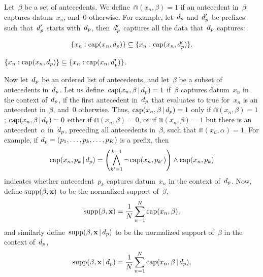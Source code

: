 Let~$\beta$ be a set of antecedents.
%
We define~${\Cap(x_n, \beta) = 1}$ if an antecedent in~$\beta$
captures datum~$x_n$, and~0 otherwise.
%
For example, let~$d_p$ and~$d_p'$ be prefixes such that~$d_p'$ starts
with~$d_p$, then~$d_p'$ captures all the data that~$d_p$ captures:
\begin{arxiv}
\begin{align*}
\{x_n: \textnormal{cap}(x_n, d_p)\} \subseteq \{x_n: \textnormal{cap}(x_n, d_p')\}.
\end{align*}
\end{arxiv}
\begin{kdd}
${\{x_n: \textnormal{cap}(x_n, d_p)\} \subseteq \{x_n: \textnormal{cap}(x_n, d_p')\}}$.
\end{kdd}

Now let~$d_p$ be an ordered list of antecedents,
and let~$\beta$ be a subset of antecedents in~$d_p$.
%
Let us define~${\textnormal{cap}(x_n, \beta \,|\, d_p) = 1}$ if~$\beta$
captures datum~$x_n$ in the context of~$d_p$,
\ie if the first antecedent in~$d_p$ that evaluates to true for~$x_n$
is an antecedent in~$\beta$, and~0 otherwise.
%
Thus, ${\textnormal{cap}(x_n, \beta \,|\, d_p) = 1}$ only if ${\Cap(x_n, \beta) = 1}$;
${\textnormal{cap}(x_n, \beta \,|\, d_p) = 0}$ either if ${\Cap(x_n, \beta) = 0}$,
or if ${\Cap(x_n, \beta) = 1}$ but there is an antecedent~$\alpha$ in~$d_p$,
preceding all antecedents in~$\beta$, such that ${\Cap(x_n, \alpha) = 1}$.
%
For example, if ${d_p = (p_1, \dots, p_k, \dots, p_K)}$ is a prefix, then
\begin{align*}
\textnormal{cap}(x_n, p_k \,|\, d_p) =
  \left(\bigwedge_{k'=1}^{k - 1} \neg\, \textnormal{cap}(x_n, p_{k'}) \right)
  \wedge \textnormal{cap}(x_n, p_k)
\end{align*}
indicates whether antecedent~$p_k$ captures datum~$x_n$ in the context of~$d_p$.
%
Now, define ${\textnormal{supp}(\beta, \mathbf{x})}$ to be the normalized support of~$\beta$,
\begin{align}
\textnormal{supp}(\beta, \mathbf{x}) = \frac{1}{N} \sum_{n=1}^N \textnormal{cap}(x_n, \beta),
\label{eq:support}
\end{align}
and similarly define~${\textnormal{supp}(\beta, \mathbf{x} \,|\, d_p)}$
to be the normalized support of~$\beta$ in the context of~$d_p$,
\begin{align}
\textnormal{supp}(\beta, \mathbf{x} \,|\, d_p) = \frac{1}{N} \sum_{n=1}^N \textnormal{cap}(x_n, \beta \,|\, d_p),
\label{eq:support-context}
\end{align}

